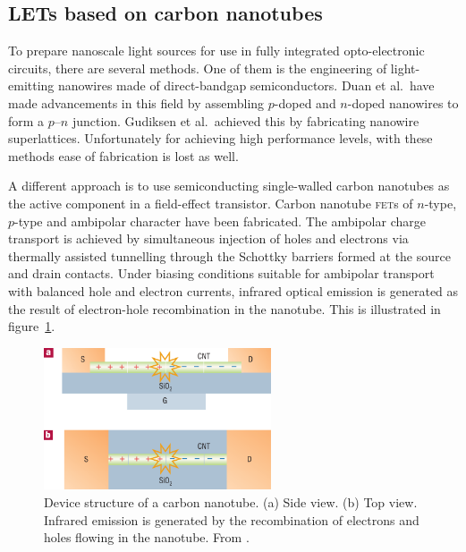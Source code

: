 \subsection{LETs based on carbon nanotubes} %


To prepare nanoscale light sources for use in fully integrated opto-electronic circuits, there are several methods. One of them is the engineering of light-emitting nanowires made of direct-bandgap semiconductors. Duan et al.\ have made advancements in this field by assembling $p$-doped and $n$-doped nanowires to form a $p$--$n$ junction. Gudiksen et al.~achieved this by fabricating nanowire superlattices. Unfortunately for achieving high performance levels, with these methods ease of fabrication is lost as well. %

A different approach is to use semiconducting single-walled carbon nanotubes as the active component in a field-effect transistor. Carbon nanotube \textsc{fet}s of $n$-type, $p$-type and ambipolar character have been fabricated. The ambipolar charge transport is achieved by simultaneous injection of holes and electrons via thermally assisted tunnelling through the Schottky barriers formed at the source and drain contacts. Under biasing conditions suitable for ambipolar transport with balanced hole and electron currents, infrared optical emission is generated as the result of electron-hole recombination in the nanotube. This is illustrated in figure~\ref{fig:carbontube}. 

\begin{figure}[!ht]
 \begin{center}
  \includegraphics[width=0.6\textwidth]{fig_1}
  \caption{Device structure of a carbon nanotube. (a) Side view. (b) Top view. Infrared emission is generated by the recombination of electrons and holes flowing in the nanotube. From \citet{Muccini}.}
  \label{fig:carbontube}
 \end{center}
\end{figure}

